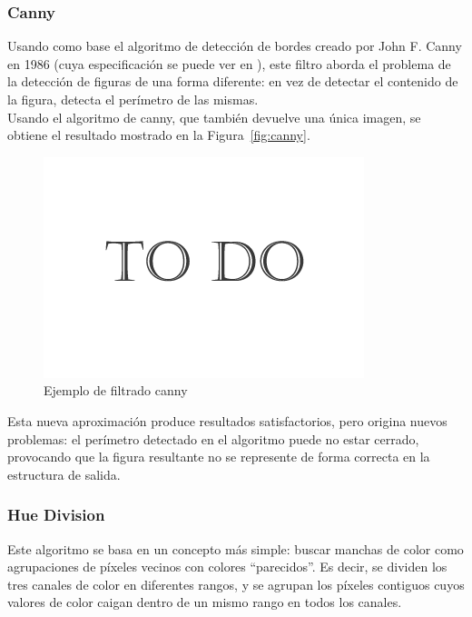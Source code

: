 {	\subsubsection{Canny}
	
	Usando como base el algoritmo de detección de bordes creado por John F. Canny en 1986 (cuya especificación se puede ver en \cite{pajares}), este filtro aborda el problema de la detección de figuras de una forma diferente: en vez de detectar el contenido de la figura, detecta el perímetro de las mismas.\\
	
	Usando el algoritmo de canny, que también devuelve una única imagen, se obtiene el resultado mostrado en la Figura~\ref{fig:canny}.\\
	
		\begin{figure}[htbp]
		\centering
		\hspace*{-0.3in}
		\includegraphics[scale=0.47]{graphics/todo.png}
		\caption{Ejemplo de filtrado canny}
		\label{fig:adaptive}
		\end{figure}
		
	Esta nueva aproximación produce resultados satisfactorios, pero origina nuevos problemas: el perímetro detectado en el algoritmo puede no estar cerrado, provocando que la figura resultante no se represente de forma correcta en la estructura de salida.
	
	\subsubsection{Hue Division}
	
	Este algoritmo se basa en un concepto más simple: buscar manchas de color como agrupaciones de píxeles vecinos con colores ``parecidos''. Es decir, se dividen los tres canales de color en diferentes rangos, y se agrupan los píxeles contiguos cuyos valores de color caigan dentro de un mismo rango en todos los canales.\\
	
}
